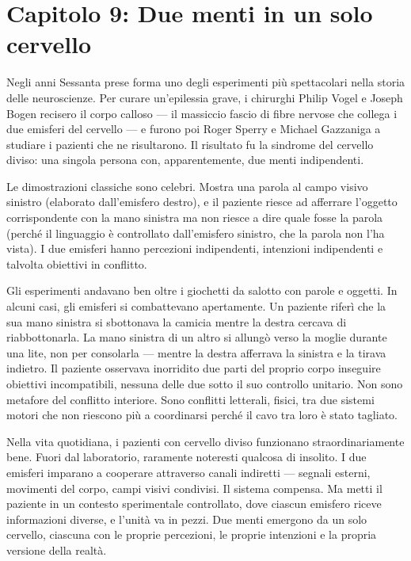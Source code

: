 \documentclass[11pt, twoside, openright]{book}
\begin{document}
\chapter*{Capitolo 9: Due menti in un solo cervello}

Negli anni Sessanta prese forma uno degli esperimenti più spettacolari nella storia delle neuroscienze. Per curare un'epilessia grave, i chirurghi Philip Vogel e Joseph Bogen recisero il corpo calloso --- il massiccio fascio di fibre nervose che collega i due emisferi del cervello --- e furono poi Roger Sperry e Michael Gazzaniga a studiare i pazienti che ne risultarono. Il risultato fu la sindrome del cervello diviso: una singola persona con, apparentemente, due menti indipendenti.

Le dimostrazioni classiche sono celebri. Mostra una parola al campo visivo sinistro (elaborato dall'emisfero destro), e il paziente riesce ad afferrare l'oggetto corrispondente con la mano sinistra ma non riesce a dire quale fosse la parola (perché il linguaggio è controllato dall'emisfero sinistro, che la parola non l'ha vista). I due emisferi hanno percezioni indipendenti, intenzioni indipendenti e talvolta obiettivi in conflitto.

Gli esperimenti andavano ben oltre i giochetti da salotto con parole e oggetti. In alcuni casi, gli emisferi si combattevano apertamente. Un paziente riferì che la sua mano sinistra si sbottonava la camicia mentre la destra cercava di riabbottonarla. La mano sinistra di un altro si allungò verso la moglie durante una lite, non per consolarla --- mentre la destra afferrava la sinistra e la tirava indietro. Il paziente osservava inorridito due parti del proprio corpo inseguire obiettivi incompatibili, nessuna delle due sotto il suo controllo unitario. Non sono metafore del conflitto interiore. Sono conflitti letterali, fisici, tra due sistemi motori che non riescono più a coordinarsi perché il cavo tra loro è stato tagliato.

Nella vita quotidiana, i pazienti con cervello diviso funzionano straordinariamente bene. Fuori dal laboratorio, raramente noteresti qualcosa di insolito. I due emisferi imparano a cooperare attraverso canali indiretti --- segnali esterni, movimenti del corpo, campi visivi condivisi. Il sistema compensa. Ma metti il paziente in un contesto sperimentale controllato, dove ciascun emisfero riceve informazioni diverse, e l'unità va in pezzi. Due menti emergono da un solo cervello, ciascuna con le proprie percezioni, le proprie intenzioni e la propria versione della realtà.
\end{document}
